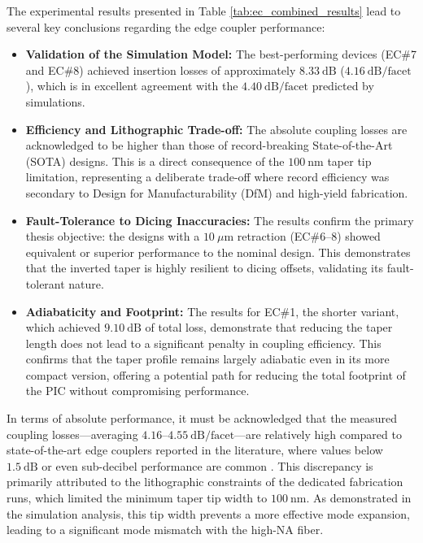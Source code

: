 The experimental results presented in Table \ref{tab:ec_combined_results} lead to several key 
conclusions regarding the edge coupler performance:

\begin{itemize}
    \item \textbf{Validation of the Simulation Model:} The best-performing devices 
    (EC\#7 and EC\#8) achieved insertion losses of approximately $8.33~\text{dB}$ 
    ($4.16~\text{dB/facet}$), which is in excellent agreement with the $4.40~\text{dB/facet}$ 
    predicted by simulations.
    \item \textbf{Efficiency and Lithographic Trade-off:} The absolute coupling losses are 
    acknowledged to be higher than those of record-breaking State-of-the-Art (SOTA) designs. This 
    is a direct consequence of the $100~\text{nm}$ taper tip limitation, representing a deliberate 
    trade-off where record efficiency was secondary to Design for Manufacturability (DfM) and 
    high-yield fabrication.
    \item \textbf{Fault-Tolerance to Dicing Inaccuracies:} The results confirm the primary thesis 
    objective: the designs with a $10~\mu\text{m}$ retraction (EC\#6--8) showed equivalent or 
    superior performance to the nominal design. This demonstrates that the inverted taper is highly 
    resilient to dicing offsets, validating its fault-tolerant nature.
    \item \textbf{Adiabaticity and Footprint:} The results for EC\#1, the shorter variant, which 
    achieved $9.10~\text{dB}$ of total loss, demonstrate that reducing the taper length does not 
    lead to a significant penalty in coupling efficiency. This confirms that the taper profile 
    remains largely adiabatic even in its more compact version, offering a potential path for 
    reducing the total footprint of the PIC without compromising performance.
\end{itemize}


In terms of absolute performance, it must be acknowledged that the measured coupling 
losses—averaging $4.16\text{--}4.55~\text{dB/facet}$—are relatively high compared to 
state-of-the-art edge couplers reported in the literature, where values below $1.5~\text{dB}$ or 
even sub-decibel performance are common \cite{barwiczAutomatedHighthroughputPhotonic2018, 
papesFiberchipEdgeCoupler2016, yiPolarizationinsensitiveLowlossOband2025, 
gaoEfficientSiliconphotonicsEdge2025}. This discrepancy is primarily attributed to the lithographic 
constraints of the dedicated fabrication runs, which limited the minimum taper tip width to 
$100~\text{nm}$. As demonstrated in the simulation analysis, this tip width prevents a more 
effective mode expansion, leading to a significant mode mismatch with the high-NA fiber.

